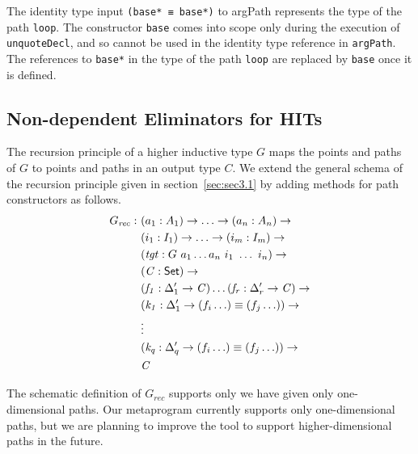 \documentclass[sigplan,10pt]{acmart}
\begin{document}
The identity type input {\tt (base* ≡ base*)} to argPath represents the type of the path {\tt loop}. The constructor {\tt base} comes into scope only during the execution of {\tt unquoteDecl}, and so cannot be used in the identity type reference in {\tt argPath}. The references to \texttt{base*} in the type of the path \texttt{loop} are replaced by \texttt{base} once it is defined.

\subsection{Non-dependent Eliminators for HITs}
\label{sec:sec4.2}

The recursion principle of a higher inductive type $G$ maps the points and paths of $G$ to points and paths in an output type $C$. We extend the general schema of the recursion principle given in section~\ref{sec:sec3.1} by adding methods for path constructors as follows.
\begin{align*}
G_{\mathit{rec}} :\ & (a_1 : A_1) \to \ldots \to (a_n : A_n) \to\\
& (i_1 : I_1) \to \ldots \to (i_m : I_m) \to\\
& (\mathit{tgt} : G\ a_1 \ldots a_n\ i_1\ \ldots\ i_n) \to\\
& (\mathit{C} : \textsf{Set}{}) \to \\
& (\mathit{f_1} : \Delta_1^\prime \to \mathit{C}) \ldots (\mathit{f_r} : \Delta_r^\prime \to \mathit{C}) \to \\
& (\mathit{k_1} : \Delta_1^\prime \to (f_i \ldots) \equiv (f_j \ldots)) \to \\
& \vdots \\
& (\mathit{k_q} : \Delta_q^\prime \to (f_i \ldots) \equiv (f_j \ldots)) \to \\
& \mathit{C}
\end{align*}
 
The schematic definition of $G_{\mathit{rec}}$ supports only we have given only one-dimensional paths.
Our metaprogram currently supports only one-dimensional paths, but we are planning to improve the tool to support higher-dimensional paths in the future. 
\end{document}
